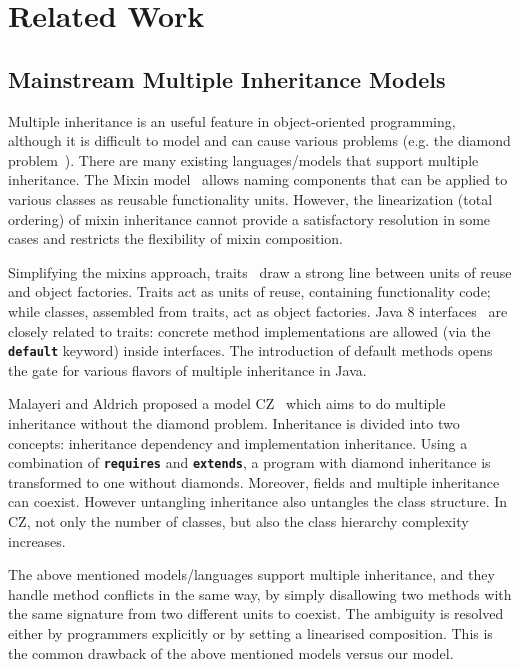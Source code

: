 \section{Related Work}

\subsection{Mainstream Multiple Inheritance Models}
Multiple inheritance is an useful feature in object-oriented
programming, although it is difficult to model and can 
cause various problems (e.g. the diamond problem~\cite{Sak89dis,Singh1995}).  There are many existing languages/models that support multiple 
inheritance. The Mixin model~\cite{} allows naming components 
that can be applied to various classes as reusable functionality units. However, the linearization (total ordering) of mixin 
inheritance cannot provide a satisfactory resolution in some cases and restricts the flexibility of mixin composition. 

Simplifying the mixins approach, traits~\cite{scharli03traits} draw a
strong line between units of reuse and object factories.  Traits act
as units of reuse, containing functionality code; while classes,
assembled from traits, act as object factories. Java 8
interfaces~\cite{} are closely related to traits: concrete method
implementations are allowed (via the \textbf{\texttt{default}}
keyword) inside interfaces.  The introduction of default methods opens
the gate for various flavors of multiple inheritance in Java.

Malayeri and Aldrich proposed a model CZ~\cite{malayeri2009cz} which
aims to do multiple inheritance without the diamond problem.
Inheritance is divided into two concepts: inheritance dependency and
implementation inheritance.  Using a combination of
\textbf{\texttt{requires}} and \textbf{\texttt{extends}}, a program
with diamond inheritance is transformed to one without
diamonds. Moreover, fields and multiple inheritance can coexist.
However untangling inheritance also untangles the class structure. In
CZ, not only the number of classes, but also the class hierarchy
complexity increases.

The above mentioned models/languages support multiple inheritance, and
they handle method conflicts in the same way, by simply disallowing
two methods with the same signature from two different units to
coexist. The ambiguity is resolved either by programmers explicitly or
by setting a linearised composition. This is the common drawback of
the above mentioned models versus our model.

